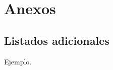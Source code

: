 \documentclass[11pt,spanish,a4paper,hidelinks]{book}
\begin{document}
	
	\printbibliography[heading=firstlevel,title=Bibliografía]
	\label{sec:biblio}
	\newpage\thispagestyle{empty}
	\part{Anexos}
	\def\thechapter{\Alph{chapter}}
	\makeatletter
	\renewcommand{\@chapapp}{Apéndice}
	\makeatother
	\chapter{Listados adicionales}
	
	Ejemplo.
\end{document}
